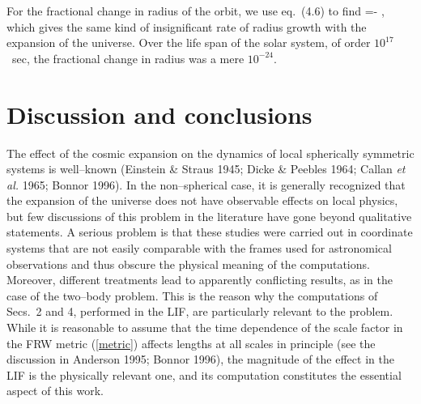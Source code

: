 For the fractional change in radius of the orbit, we use eq.~(4.6) to find
\be
{}=- \; ,
\ee
  which gives the same kind of insignificant rate of radius growth with
  the expansion of the universe. Over the life span of the solar system, 
of order $10^{17}$~sec, the fractional change in radius was a mere 
$10^{-24}$.
  
  \section{Discussion and conclusions}
  
  The effect of the cosmic expansion on the dynamics of local spherically
  symmetric systems is well--known (Einstein \& Straus 1945; Dicke \&
Peebles
  1964; Callan {\em et al.} 1965; Bonnor 1996). In the non--spherical
case, it is
  generally recognized that the expansion of the universe does not have
  observable effects on local physics, but few discussions of this problem
in the
  literature have gone beyond qualitative statements. A serious problem
  is that these
  studies were carried out in coordinate systems that are not easily
comparable
  with the frames used for astronomical observations and thus obscure the
physical
  meaning of the computations. Moreover, different treatments lead to
apparently
  conflicting results, as in the case of the two--body problem. This is
the
  reason why the computations of Secs.~2 and 4, performed in the LIF, 
  are particularly relevant to the problem. While it is reasonable to
assume that
  the time dependence of the scale factor  in the FRW metric
  (\ref{metric}) affects lengths at all scales in principle (see the discussion 
  in Anderson 1995; Bonnor 1996), the magnitude of the effect in the LIF is
  the physically relevant one, and its computation constitutes the essential
  aspect of this work. 
  
